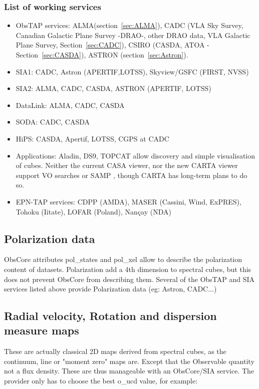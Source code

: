 \documentclass[11pt,a4paper]{ivoa}
\begin{document}
\subsubsection{List of working services}
\begin{itemize}
\item ObsTAP services: ALMA(section~\ref{sec:ALMA}), CADC (VLA Sky Survey, Canadian Galactic Plane Survey -DRAO-, other DRAO data, VLA Galactic Plane Survey, Section~\ref{sec:CADC}), CSIRO (CASDA, ATOA - Section~\ref{sec:CASDA}), ASTRON (section~\ref{sec:Astron}).
\item SIA1: CADC, Astron (APERTIF,LOTSS), Skyview/GSFC (FIRST, NVSS)
\item SIA2: ALMA, CADC, CASDA, ASTRON (APERTIF, LOTSS)
\item DataLink: ALMA, CADC, CASDA
\item SODA: CADC, CASDA
\item HiPS: CASDA, Apertif, LOTSS, CGPS at CADC
\item Applications: Aladin, DS9, TOPCAT allow discovery and simple visualisation of cubes. Neither the current CASA viewer, nor the new CARTA viewer support VO searches or SAMP \citep{2009ivoa.spec.0421B}, though CARTA has long-term plans to do so.
\item EPN-TAP services: CDPP (AMDA), MASER (Cassini, Wind, ExPRES), Tohoku (Iitate), LOFAR (Poland), Nan\c cay (NDA)
\end{itemize}


\subsection{Polarization data}
 ObsCore attributes pol\_states and pol\_xel allow to describe the polarization content of datasets. Polarization add a 4th dimension to spectral cubes, but this does not prevent ObsCore from describing them. Several of the ObsTAP and SIA services listed above provide Polarization data (eg: Astron, CADC...)


\subsection{Radial velocity, Rotation and dispersion measure maps}

These are actually classical 2D maps derived from spectral cubes, as the continuum, line or "moment zero" maps are. Except that the Observable quantity not a flux density. These are thus manageable with an ObsCore/SIA service. The provider only has to choose the best o\_ucd value, for example:
\end{document}
